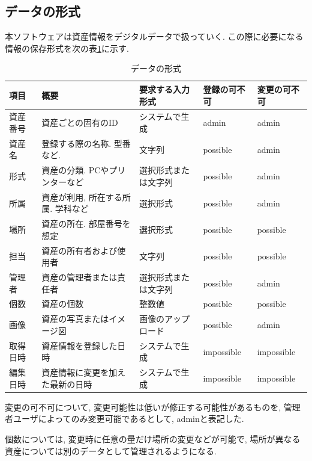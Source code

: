 \documentclass[11ptm]{jsarticle}
\begin{document}
\subsection{データの形式}
\label{subsec:データの形式}
本ソフトウェアは資産情報をデジタルデータで扱っていく. この際に必要になる情報の保存形式を次の表\ref{tb:データの形式}に示す.
\begin{table}[h]
  \caption{データの形式}
  \label{tb:データの形式}
  \centering
  \begin{tabular}{@{}l|l|l|l|l@{}}
    項目     & 概要                               & 要求する入力形式     & 登録の可不可 & 変更の可不可 \\
    \hline\hline
    資産番号 & 資産ごとの固有のID                 & システムで生成       & admin        & admin        \\
    \hline
    資産名   & 登録する際の名称. 型番など.        & 文字列               & possible     & admin        \\
    \hline
    形式     & 資産の分類. PCやプリンターなど     & 選択形式または文字列 & possible     & admin        \\
    \hline
    所属     & 資産が利用, 所在する所属. 学科など & 選択形式             & possible     & admin        \\
    \hline
    場所     & 資産の所在. 部屋番号を想定         & 選択形式             & possible     & possible     \\
    \hline
    担当     & 資産の所有者および使用者           & 文字列               & possible     & possible     \\
    \hline
    管理者   & 資産の管理者または責任者           & 選択形式または文字列 & possible     & admin        \\
    \hline
    個数     & 資産の個数                         & 整数値               & possible     & possible     \\
    \hline
    画像     & 資産の写真またはイメージ図         & 画像のアップロード   & possible     & admin        \\
    \hline\hline
    取得日時 & 資産情報を登録した日時             & システムで生成       & impossible   & impossible   \\
    \hline
    編集日時 & 資産情報に変更を加えた最新の日時   & システムで生成       & impossible   & impossible
  \end{tabular}
\end{table}\par
変更の可不可について, 変更可能性は低いが修正する可能性があるものを, 管理者ユーザによってのみ変更可能であるとして, adminと表記した.\par
個数については, 変更時に任意の量だけ場所の変更などが可能で, 場所が異なる資産については別のデータとして管理されるようになる.
\end{document}
